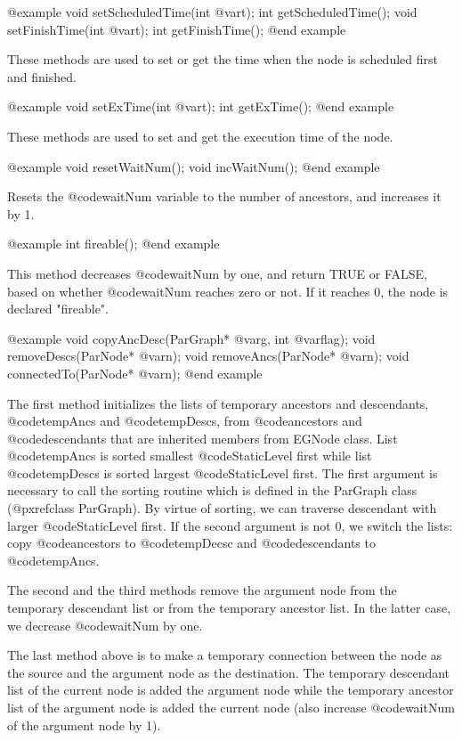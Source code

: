 @example
void setScheduledTime(int @var{t});
int getScheduledTime();
void setFinishTime(int @var{t});
int getFinishTime();
@end example

These methods are used to set or get the time when the node is
scheduled first and finished.

@example
void setExTime(int @var{t});
int getExTime();
@end example

These methods are used to set and get the execution time of the node.

@example
void resetWaitNum();
void incWaitNum();
@end example

Resets the @code{waitNum} variable to the number of ancestors, and
increases it by 1.

@example
int fireable();
@end example

This method decreases @code{waitNum} by one, and return TRUE or FALSE,
based on whether @code{waitNum} reaches zero or not. If it reaches 0,
the node is declared "fireable".

@example
void copyAncDesc(ParGraph* @var{g}, int @var{flag});
void removeDescs(ParNode* @var{n});
void removeAncs(ParNode* @var{n});
void connectedTo(ParNode* @var{n});
@end example

The first method initializes the lists of temporary ancestors and
descendants, @code{tempAncs} and @code{tempDescs}, from 
@code{ancestors} and @code{descendants} that are inherited members from
EGNode class. List @code{tempAncs} is sorted smallest @code{StaticLevel}
first while list @code{tempDescs} is sorted largest @code{StaticLevel}
first. The first argument is necessary to call the sorting routine which
is defined in the ParGraph class (@pxref{class ParGraph}). By virtue of
sorting, we can traverse descendant with larger @code{StaticLevel} first.
If the second argument is not 0, we switch the lists: copy 
@code{ancestors} to @code{tempDecsc} and @code{descendants} to
@code{tempAncs}.

The second and the third methods remove the argument node from the
temporary descendant list or from the temporary ancestor list. In the latter
case, we decrease @code{waitNum} by one.

The last method above is to make a temporary connection between the 
node as the source and the argument node as the destination. The temporary
descendant list of the current node is added the argument node while the
temporary ancestor list of the argument node is added the current node (also
increase @code{waitNum} of the argument node by 1).

